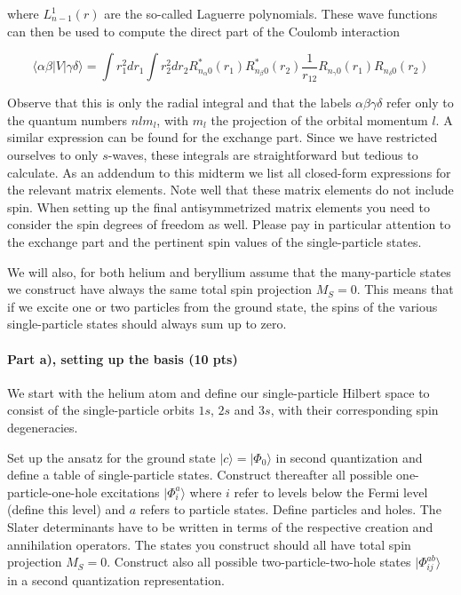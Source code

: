 \documentclass[a4wide,10pt]{article}
\begin{document}
where $L_{n-1}^1(r)$ are the so-called Laguerre polynomials.  These
wave functions can then be used to compute the direct part of the
Coulomb interaction

\begin{equation*}
\langle \alpha\beta| V| \gamma\delta\rangle = \int r_1^2dr_1 \int r_2^2dr_2R_{n_{\alpha}0}^*(r_1) R_{n_{\beta}0}^*(r_2) 
  \frac{1}{r_{12}}R_{n_{\gamma}0}(r_1)R_{n_{\delta}0}(r_2)
\end{equation*}

Observe that this is only the radial integral and that the labels
$\alpha\beta\gamma\delta$ refer only to the quantum numbers $nlm_l$,
with $m_l$ the projection of the orbital momentum $l$.  A similar
expression can be found for the exchange part. Since we have
restricted ourselves to only $s$-waves, these integrals are
straightforward but tedious to calculate. As an addendum to this
midterm we list all closed-form expressions for the relevant matrix
elements. Note well that these matrix elements do not include
spin. When setting up the final antisymmetrized matrix elements you
need to consider the spin degrees of freedom as well. Please pay in
particular attention to the exchange part and the pertinent
spin values of the single-particle states.

We will also, for both helium and beryllium assume that the
many-particle states we construct have always the same total spin
projection $M_S=0$. This means that if we excite one or two particles
from the ground state, the spins of the various single-particle states
should always sum up to zero.

\paragraph{Part a), setting up the basis (10 pts)}
We start with the helium atom and define our single-particle Hilbert
space to consist of the single-particle orbits $1s$, $2s$ and $3s$,
with their corresponding spin degeneracies.

Set up the ansatz for the ground state $|c\rangle = |\Phi_0\rangle$ in
second quantization and define a table of single-particle
states. Construct thereafter all possible one-particle-one-hole
excitations $|\Phi_i^a\rangle$ where $i$ refer to levels below the
Fermi level (define this level) and $a$ refers to particle
states. Define particles and holes. The Slater determinants have to be
written in terms of the respective creation and annihilation
operators.  The states you construct should all have total spin
projection $M_S=0$.  Construct also all possible two-particle-two-hole
states $|\Phi_{ij}^{ab}\rangle$ in a second quantization
representation.
\end{document}
